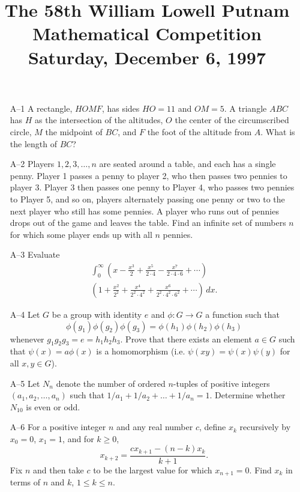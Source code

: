 \documentclass[amssymb,twocolumn,pra,10pt,aps]{revtex4-1}
\begin{document}
\title{The 58th William Lowell Putnam Mathematical Competition \\
    Saturday, December 6, 1997}
\maketitle

\begin{itemize}
\item[A--1]
A rectangle, $HOMF$, has sides $HO=11$ and $OM=5$.  A triangle
$ABC$ has $H$ as the intersection of the altitudes, $O$ the center of
the circumscribed circle, $M$ the midpoint of $BC$, and $F$ the foot of the
altitude from $A$.  What is the length of $BC$?

\item[A--2]
Players $1,2,3,\ldots,n$ are seated around a table, and each has
a single penny.  Player 1 passes a penny to player 2, who then passes
two pennies to player 3.  Player 3 then passes one penny to Player 4,
who passes two pennies to Player 5, and so on, players alternately
passing one penny or two to the next player who still has some
pennies.  A player who runs out of pennies drops out of the game and
leaves the table.  Find an infinite set of numbers $n$ for which some
player ends up with all $n$ pennies.

\item[A--3]
Evaluate
\begin{gather*}
\int_0^\infty \left(x-\frac{x^3}{2}+\frac{x^5}{2\cdot
4}-\frac{x^7}{2\cdot 4\cdot 6}+\cdots\right) \\
\left(1+\frac{x^2}{2^2}+
\frac{x^4}{2^2\cdot 4^2}+\frac{x^6}{2^2\cdot 4^2 \cdot 6^2}+\cdots\right)\,dx.
\end{gather*}

\item[A--4]
Let $G$ be a group with identity $e$ and $\phi:G\rightarrow G$
a function such that
\[\phi(g_1)\phi(g_2)\phi(g_3)=\phi(h_1)\phi(h_2)\phi(h_3)\]
whenever $g_1g_2g_3=e=h_1h_2h_3$.  Prove that there exists an element
$a\in G$ such that $\psi(x)=a\phi(x)$ is a homomorphism (i.e.
$\psi(xy)=\psi(x)\psi(y)$ for all $x,y\in G$).

\item[A--5]
Let $N_n$ denote the number of ordered $n$-tuples of positive
integers $(a_1,a_2,\ldots,a_n)$ such that $1/a_1 + 1/a_2 +\ldots +
1/a_n=1$.  Determine whether $N_{10}$ is even or odd.

\item[A--6]
For a positive integer $n$ and any real number $c$, define
$x_k$ recursively by $x_0=0$, $x_1=1$, and for $k\geq 0$,
\[x_{k+2}=\frac{cx_{k+1}-(n-k)x_k}{k+1}.\]
Fix $n$ and then take $c$ to be the largest value for which $x_{n+1}=0$.
Find $x_k$ in terms of $n$ and $k$, $1\leq k\leq n$.


\end{itemize}
\end{document}
